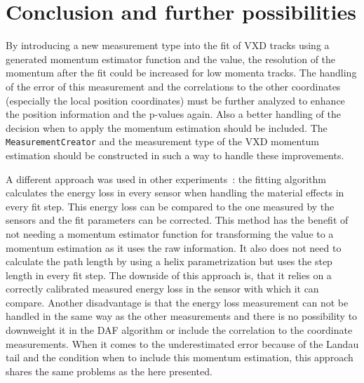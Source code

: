 \section{Conclusion and further possibilities}

By introducing a new measurement type into the fit of VXD tracks using a generated momentum estimator function and the \dedx value, the resolution of the momentum after the fit could be increased for low momenta tracks. The handling of the error of this measurement and the correlations to the other coordinates (especially the local position coordinates) must be further analyzed to enhance the position information and the p-values again. Also a better handling of the decision when to apply the momentum estimation should be included. The \texttt{MeasurementCreator} and the measurement type of the VXD momentum estimation should be constructed in such a way to handle these improvements.

A different approach was used in other experiments~\cite{sergey}: the fitting algorithm calculates the energy loss in every sensor when handling the material effects in every fit step. This energy loss can be compared to the one measured by the sensors and the fit parameters can be corrected. This method has the benefit of not needing a momentum estimator function for transforming the \dedx value to a momentum estimation as it uses the raw \dedx information. It also does not need to calculate the path length by using a helix parametrization but uses the step length in every fit step. The downside of this approach is, that it relies on a correctly calibrated measured energy loss in the sensor with which it can compare. Another disadvantage is that the energy loss measurement can not be handled in the same way as the other measurements and there is no possibility to downweight it in the DAF algorithm or include the correlation to the coordinate measurements. When it comes to the underestimated error because of the Landau tail and the condition when to include this momentum estimation, this approach shares the same problems as the here presented.

